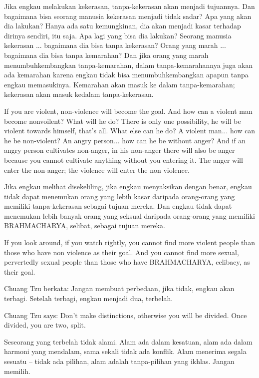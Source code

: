 \bahasa
Jika engkau melakukan kekerasan, tanpa-kekerasan akan menjadi tujuannya. Dan bagaimana bisa seorang manusia kekerasan menjadi tidak sadar? Apa yang akan dia lakukan? Hanya ada satu kemungkinan, dia akan menjadi kasar terhadap dirinya sendiri, itu saja. Apa lagi yang bisa dia lakukan? Seorang manusia kekerasan ... bagaimana dia bisa tanpa kekerasan? Orang yang marah ... bagaimana dia bisa tanpa kemarahan? Dan jika orang yang marah menumbuhkembangkan tanpa-kemarahan, dalam tanpa-kemarahannya juga akan ada kemarahan karena engkau tidak bisa menumbuhkembangkan apapun tanpa engkau memasukinya. Kemarahan akan masuk ke dalam tanpa-kemarahan; kekerasan akan masuk kedalam tanpa-kekerasan.

\english
If you are violent, non-violence will become the goal. And how can a violent man become nonvoilent? What will he do? There is only one possibility, he will be violent towards himself, that's all. What else can he do? A violent man... how can he be non-violent? An angry person... how can he be without anger? And if an angry person cultivates non-anger, in his non-anger there will also be anger because you cannot cultivate anything without you entering it. The anger will enter the non-anger; the violence will enter the non violence.

\bahasa
Jika engkau melihat disekeliling, jika engkau menyaksikan dengan benar, engkau tidak dapat menemukan orang yang lebih kasar daripada orang-orang yang memiliki tanpa-kekerasan sebagai tujuan mereka. Dan engkau tidak dapat menemukan lebih banyak orang yang seksual daripada orang-orang yang memiliki BRAHMACHARYA, selibat, sebagai tujuan mereka.

\english
If you look around, if you watch rightly, you cannot find more violent people than those who have non violence as their goal. And you cannot find more sexual, pervertedly sexual people than those who have BRAHMACHARYA, celibacy, as their goal.

\bahasa
Chuang Tzu berkata: Jangan membuat perbedaan, jika tidak, engkau akan terbagi. Setelah terbagi, engkau menjadi dua, terbelah.

\english
Chuang Tzu says: Don't make distinctions, otherwise you will be divided. Once divided, you are two, split.

\bahasa
Seseorang yang terbelah tidak alami. Alam ada dalam kesatuan, alam ada dalam harmoni yang mendalam, sama sekali tidak ada konflik. Alam menerima segala sesuatu -- tidak ada pilihan, alam adalah tanpa-pilihan yang ikhlas. Jangan memilih.

